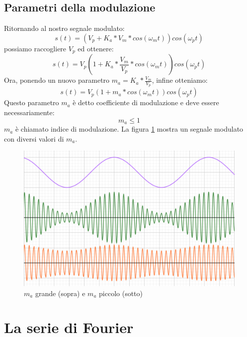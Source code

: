 \documentclass[11pt,a4paper]{article}
\begin{document}
\subsection{Parametri della modulazione}

Ritornando al nostro segnale modulato:
$$
s(t) = (V_p + K_a * V_m * cos(\omega_m t) ) cos(\omega_p t)
$$
possiamo raccogliere $V_p$ ed ottenere:
$$
s(t) = V_p (1 + K_a * \frac{V_m}{V_p} * cos(\omega_m t) ) cos(\omega_p t)
$$
Ora, ponendo un nuovo parametro $m_a = K_a * \frac{V_m}{V_p}$, infine otteniamo:
$$
s(t) = V_p (1 + m_a * cos(\omega_m t) ) cos(\omega_p t)
$$
Questo parametro $m_a$ è detto coefficiente di modulazione e deve essere necessariamente:
$$
m_a \leq 1
$$
$m_a$ è chiamato indice di modulazione. La figura \ref{fig:ma} mostra un segnale modulato con diversi valori di $m_a$.

\begin{figure}
  \includegraphics[width=\linewidth]{images/ma.png}
  \caption{$m_a$ grande (sopra) e $m_a$ piccolo (sotto)}
  \label{fig:ma}
\end{figure}

\section{La serie di Fourier}
\end{document}
